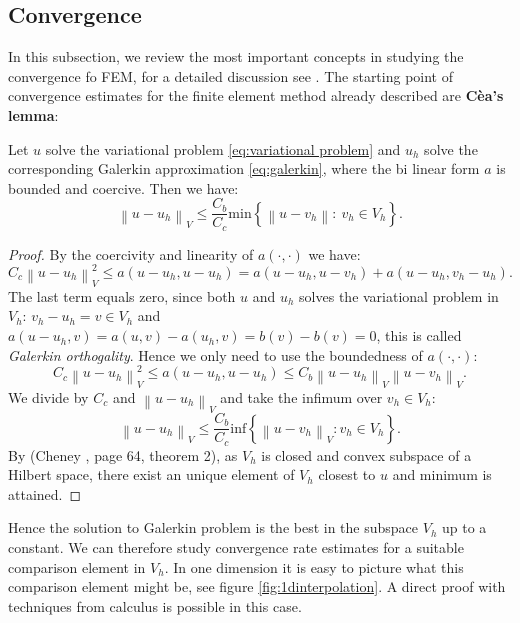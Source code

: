 \documentclass[../Main/main.tex]{subfiles}
\begin{document}
	\subsection*{Convergence}
	
	In this subsection, we review the most important concepts in studying the convergence fo FEM, for a detailed discussion see \cite{Knabner}.
	The starting point of convergence estimates for the finite element method already described are \textbf{Cèa's lemma}:
	\begin{theorem}
		Let $u$ solve the variational problem \eqref{eq:variational problem} and $u_h$ solve the corresponding Galerkin approximation \eqref{eq:galerkin}, where the bi linear form $a$ is bounded and coercive. Then we have:
		\begin{equation}
			\left \| u-u_h \right \|_V \leq \frac{C_b}{C_c}\text{min} \left \{ \left \| u-v_h \right \|: \ v_h \in V_h \right \}.
		\end{equation}
		
	\end{theorem}
	\begin{proof}
		By the coercivity and linearity of $a(\cdot,\cdot)$ we have:
		\begin{equation*}
			C_c \left \| u-u_h \right \|^2_V \leq a(u-u_h,u-u_h) = a(u-u_h,u-v_h) + a(u-u_h, v_h - u_h).
		\end{equation*}
		The last term equals zero, since both $u$ and $u_h$ solves the variational problem in $V_h$: $v_h-u_h = v \in V_h$ and $a(u-u_h,v) = a(u,v)-a(u_h,v) = b(v)-b(v) = 0$, this is called \emph{Galerkin orthogality}. Hence we only need to use the boundedness of $a(\cdot,\cdot)$:
		\begin{equation*}
			C_c \left \| u-u_h \right \|^2_V \leq a(u-u_h,u-u_h) \leq C_b \left \| u-u_h \right \|_V \left \| u-v_h \right \|_V.
		\end{equation*}
		We divide by $C_c$ and $\left \| u-u_h \right \|_V$ and take the infimum over $v_h \in V_h$:
		\begin{equation*}
			\left \| u-u_h \right \|_V \leq \frac{C_b}{C_c} \text{inf} \left \{ \left \| u-v_h \right \|_V: v_h \in V_h \right \}.
		\end{equation*}
		By (Cheney \cite{Cheney}, page 64, theorem 2), as $V_h$ is closed and convex subspace of a Hilbert space, there exist an unique element of $V_h$ closest to $u$ and minimum is attained.  
	\end{proof}
	Hence the solution to Galerkin problem is the best in the subspace $V_h$ up to a constant. We can therefore study convergence rate estimates for a suitable comparison element in $V_h$. In one dimension it is easy to picture what this comparison element might be, see figure \ref{fig:1dinterpolation}. A direct proof with techniques from calculus is possible in this case.\\
\end{document}
